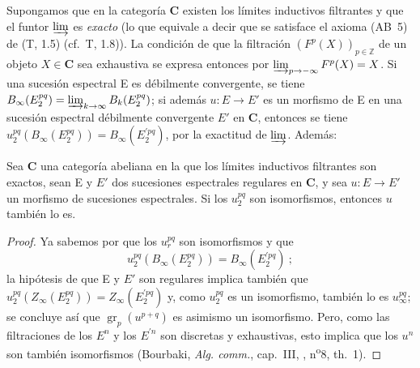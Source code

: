 \begin{env}[11.1.4]
\label{0.11.1.4}
\label{0.11.1.4-fr}
Supongamos que en la categoría $\boldsymbol{C}$ existen los límites inductivos filtrantes y que el funtor $\varinjlim$ es \emph{exacto} (lo que equivale a decir que se satisface el axioma (AB~5) de (T, 1.5) (cf.~T, 1.8)).
La condición de que la filtración $(F^p(X))_{p\in\mathbb Z}$ de un objeto $X\in\boldsymbol{C}$ sea exhaustiva se expresa entonces por $\varinjlim_{p\to-\infty}F^p(X)=X$. Si una sucesión espectral E es débilmente convergente, se tiene
$B_\infty(E_2^{pq})=\varinjlim_{k\to\infty}B_k(E_2^{pq})$; si además $u:E\to E'$ es un morfismo de E en una sucesión espectral débilmente convergente $E'$ en $\boldsymbol{C}$, entonces se tiene $u_2^{pq}(B_\infty(E_2^{pq}))=B_\infty(E_2^{\prime pq})$, por la exactitud de $\varinjlim$.
Además:
\end{env}

\begin{proposition}[11.1.5]
\label{0.11.1.5}
\label{0.11.1.5-fr}
Sea $\mathbf{C}$ una categoría abeliana en la que los límites inductivos filtrantes son exactos, sean \textup{E} y $E'$ dos sucesiones espectrales regulares en $\mathbf{C}$, y sea $u:E\to E'$ un morfismo de sucesiones espectrales.
Si los $u_2^{pq}$ son isomorfismos, entonces $u$ también lo es.
\end{proposition}

\begin{proof}
Ya sabemos por  que los $u_r^{pq}$ son isomorfismos y que
\[
  u_2^{pq}(B_\infty(E_2^{pq}))=B_\infty(E_2^{\prime pq})~;
\]
la hipótesis de que E y $E'$ son regulares implica también que $u_2^{pq}(Z_\infty(E_2^{pq}))=Z_\infty(E_2^{\prime pq})$ y, como $u_2^{pq}$ es un isomorfismo, también lo es $u_\infty^{pq}$; se concluye así que $\operatorname{gr}_p(u^{p+q})$ es asimismo un isomorfismo.
Pero, como las filtraciones de los $E^n$ y los $E^{\prime n}$ son discretas y exhaustivas, esto implica que los $u^n$ son también isomorfismos (Bourbaki, \emph{Alg. comm.}, cap.~III, , n\textsuperscript{o}8, th.~1).
\end{proof}

